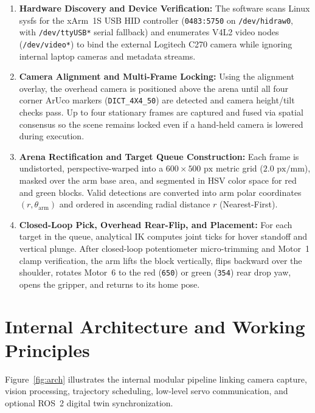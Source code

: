 \documentclass[11pt,a4paper]{article}
\begin{document}
\begin{enumerate}[leftmargin=1.6em, itemsep=0.45em]
  \item \textbf{Hardware Discovery and Device Verification:} The software scans Linux sysfs for the xArm~1S USB HID controller (\texttt{0483:5750} on \texttt{/dev/hidraw0}, with \texttt{/dev/ttyUSB*} serial fallback) and enumerates V4L2 video nodes (\texttt{/dev/video*}) to bind the external Logitech C270 camera while ignoring internal laptop cameras and metadata streams.
  \item \textbf{Camera Alignment and Multi-Frame Locking:} Using the alignment overlay, the overhead camera is positioned above the arena until all four corner ArUco markers (\texttt{DICT\_4X4\_50}) are detected and camera height/tilt checks pass. Up to four stationary frames are captured and fused via spatial consensus so the scene remains locked even if a hand-held camera is lowered during execution.
  \item \textbf{Arena Rectification and Target Queue Construction:} Each frame is undistorted, perspective-warped into a $600 \times 500\text{ px}$ metric grid ($2.0\text{ px/mm}$), masked over the arm base area, and segmented in HSV color space for red and green blocks. Valid detections are converted into arm polar coordinates $(r, \theta_{\text{arm}})$ and ordered in ascending radial distance $r$ (Nearest-First).
  \item \textbf{Closed-Loop Pick, Overhead Rear-Flip, and Placement:} For each target in the queue, analytical IK computes joint ticks for hover standoff and vertical plunge. After closed-loop potentiometer micro-trimming and Motor~1 clamp verification, the arm lifts the block vertically, flips backward over the shoulder, rotates Motor~6 to the red (\texttt{650}) or green (\texttt{354}) rear drop yaw, opens the gripper, and returns to its home pose.
\end{enumerate}

\section{Internal Architecture and Working Principles}

Figure~\ref{fig:arch} illustrates the internal modular pipeline linking camera capture, vision processing, trajectory scheduling, low-level servo communication, and optional ROS~2 digital twin synchronization.
\end{document}
